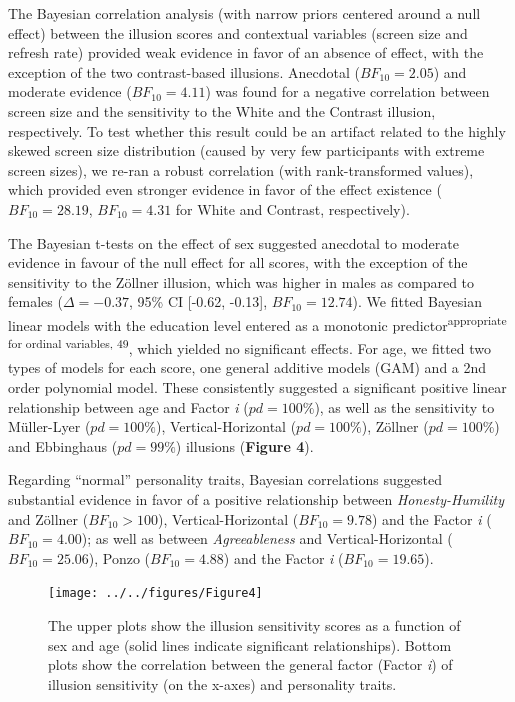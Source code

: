 \documentclass[
  man,floatsintext]{apa6}
\begin{document}
The Bayesian correlation analysis (with narrow priors centered around a null effect) between the illusion scores and contextual variables (screen size and refresh rate) provided weak evidence in favor of an absence of effect, with the exception of the two contrast-based illusions. Anecdotal (\(BF_{10} = 2.05\)) and moderate evidence (\(BF_{10} = 4.11\)) was found for a negative correlation between screen size and the sensitivity to the White and the Contrast illusion, respectively. To test whether this result could be an artifact related to the highly skewed screen size distribution (caused by very few participants with extreme screen sizes), we re-ran a robust correlation (with rank-transformed values), which provided even stronger evidence in favor of the effect existence (\(BF_{10} = 28.19\), \(BF_{10} = 4.31\) for White and Contrast, respectively).

The Bayesian t-tests on the effect of sex suggested anecdotal to moderate evidence in favour of the null effect for all scores, with the exception of the sensitivity to the Zöllner illusion, which was higher in males as compared to females (\(\Delta=-0.37\), 95\% CI {[}-0.62, -0.13{]}, \(BF_{10} = 12.74\)). We fitted Bayesian linear models with the education level entered as a monotonic predictor\textsuperscript{appropriate for ordinal variables, 49}, which yielded no significant effects. For age, we fitted two types of models for each score, one general additive models (GAM) and a 2nd order polynomial model. These consistently suggested a significant positive linear relationship between age and Factor \emph{i} (\(pd=100\%\)), as well as the sensitivity to Müller-Lyer (\(pd=100\%\)), Vertical-Horizontal (\(pd=100\%\)), Zöllner (\(pd=100\%\)) and Ebbinghaus (\(pd=99\%\)) illusions (\textbf{Figure 4}).

Regarding ``normal'' personality traits, Bayesian correlations suggested substantial evidence in favor of a positive relationship between \emph{Honesty-Humility} and Zöllner (\(BF_{10} > 100\)), Vertical-Horizontal (\(BF_{10} = 9.78\)) and the Factor \emph{i} (\(BF_{10} = 4.00\)); as well as between \emph{Agreeableness} and Vertical-Horizontal (\(BF_{10} = 25.06\)), Ponzo (\(BF_{10} = 4.88\)) and the Factor \emph{i} (\(BF_{10} = 19.65\)).

\begin{figure}
\texttt{[image: ../../figures/Figure4]} \caption{The upper plots show the illusion sensitivity scores as a function of sex and age (solid lines indicate significant relationships). Bottom plots show the correlation between the general factor (Factor \textit{i}) of illusion sensitivity (on the x-axes) and personality traits.}\label{fig:unnamed-chunk-5}
\end{figure}
\end{document}
